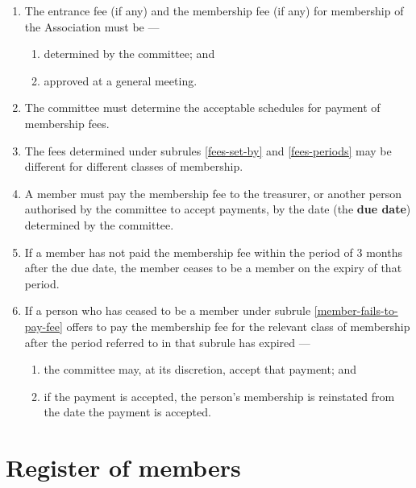 \documentclass[../constitution.tex]{subfiles}
\begin{document}
\begin{enumerate}


\item \label{fees-set-by} The entrance fee (if any) and the membership fee (if any) for membership of the Association must be ---
\begin{enumerate}
  \item determined by the committee; and
  \item approved at a general meeting.
\end{enumerate}

\item \label{fees-periods} The committee must determine the acceptable schedules for payment of membership fees.


\item The fees determined under subrules \ref{fees-set-by} and \ref{fees-periods} may be different for different classes of membership.

\item A member must pay the membership fee to the treasurer, or another person authorised by the committee to accept payments, by the date (the \textbf{due date}) determined by the committee. \label{member-must-pay-fee}
\item If a member has not paid the membership fee within the period of 3 months after the due date, the member ceases to be a member on the expiry of that period. \label{member-fails-to-pay-fee}
\item \label{member-rejoins-after-failing-to-pay-fee} If a person who has ceased to be a member under subrule \ref{member-fails-to-pay-fee} offers to pay the membership fee for the relevant class of membership after the period referred to in that subrule has expired ---

  \begin{enumerate}
  
  \item the committee may, at its discretion, accept that payment; and
  \item if the payment is accepted, the person's membership is reinstated from the date the payment is accepted.
  \end{enumerate}
\end{enumerate}

\hypertarget{division-3-register-of-members}{%
\section{Register of members}\label{division-3-register-of-members}}
\end{document}
